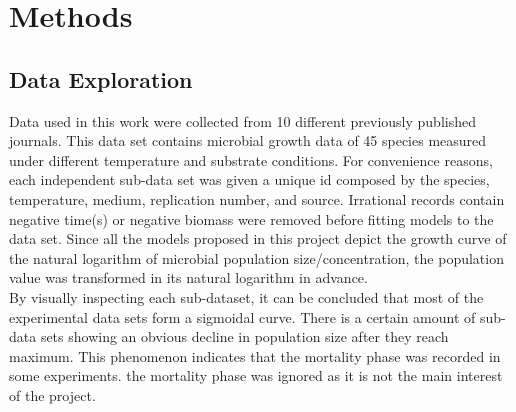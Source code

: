 
\section{Methods}
\subsection{Data Exploration}
Data used in this work were collected from 10 different previously published journals. This data set contains microbial growth data of 45 species measured under different temperature and substrate conditions. For convenience reasons, each independent sub-data set was given a unique id composed by the species, temperature, medium, replication number, and source. Irrational records contain negative time(s) or negative biomass were removed before fitting models to the data set. Since all the models proposed in this project depict the growth curve of the natural logarithm of microbial population size/concentration, the population value was transformed in its natural logarithm in advance.\\

By visually inspecting each sub-dataset, it can be concluded that most of the experimental data sets form a sigmoidal curve. There is a certain amount of sub-data sets showing an obvious decline in population size after they reach maximum. This phenomenon indicates that the mortality phase was recorded in some experiments. the mortality phase was ignored as it is not the main interest of the project.\\

